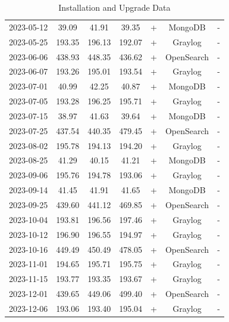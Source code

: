 \documentclass[../main.tex]{subfiles}
\begin{document}
\begin{table}[h]
\begin{tabular}{|c|c|c|c|c|c|c|}
        2023-05-12 & 39.09 & 41.91 & 39.35 & + & MongoDB & - \\
        2023-05-25 & 193.35 & 196.13 & 192.07 & + & Graylog & - \\
        2023-06-06 & 438.93 & 448.35 & 436.62 & + & OpenSearch & - \\
        2023-06-07 & 193.26 & 195.01 & 193.54 & + & Graylog & - \\
        2023-07-01 & 40.99 & 42.25 & 40.87 & + & MongoDB & - \\
        2023-07-05 & 193.28 & 196.25 & 195.71 & + & Graylog & - \\
        2023-07-15 & 38.97 & 41.63 & 39.64 & + & MongoDB & - \\
        2023-07-25 & 437.54 & 440.35 & 479.45 & + & OpenSearch & - \\
        2023-08-02 & 195.78 & 194.13 & 194.20 & + & Graylog & - \\
        2023-08-25 & 41.29 & 40.15 & 41.21 & + & MongoDB & - \\
        2023-09-06 & 195.76 & 194.78 & 193.06 & + & Graylog & - \\
        2023-09-14 & 41.45 & 41.91 & 41.65 & + & MongoDB & - \\
        2023-09-25 & 439.60 & 441.12 & 469.85 & + & OpenSearch & - \\
        2023-10-04 & 193.81 & 196.56 & 197.46 & + & Graylog & - \\
        2023-10-12 & 196.90 & 196.55 & 194.97 & + & Graylog & - \\
        2023-10-16 & 449.49 & 450.49 & 478.05 & + & OpenSearch & - \\
        2023-11-01 & 194.65 & 195.71 & 195.75 & + & Graylog & - \\
        2023-11-15 & 193.77 & 193.35 & 193.67 & + & Graylog & - \\
        2023-12-01 & 439.65 & 449.06 & 499.40 & + & OpenSearch & - \\
        2023-12-06 & 193.06 & 193.40 & 195.04 & + & Graylog & - \\
        \hline
    \end{tabular}
    \caption{Installation and Upgrade Data}
    \label{tab:graylog_results_2023}
\end{table}
\end{document}
